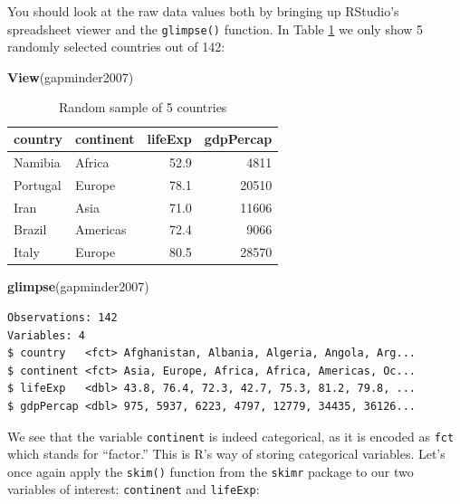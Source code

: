 \documentclass[12pt, krantz2,]{krantz}
\makeatletter
\newenvironment{Shaded}{\begin{snugshade}}{\end{snugshade}}
\newcommand{\KeywordTok}[1]{\textcolor[rgb]{0.27,0.27,0.27}{\textbf{#1}}}
\newcommand{\NormalTok}[1]{#1}
\newenvironment{kframe}{%
\medskip{}
\setlength{\fboxsep}{.8em}
 \def\at@end@of@kframe{}%
 \ifinner\ifhmode%
  \def\at@end@of@kframe{\end{minipage}}%
  \begin{minipage}{\columnwidth}%
 \fi\fi%
 \def\FrameCommand##1{\hskip\@totalleftmargin \hskip-\fboxsep
 \colorbox{shadecolor}{##1}\hskip-\fboxsep
     \hskip-\linewidth \hskip-\@totalleftmargin \hskip\columnwidth}%
 \MakeFramed {\advance\hsize-\width
   \@totalleftmargin\z@ \linewidth\hsize
   \@setminipage}}%
 {\par\unskip\endMakeFramed%
 \at@end@of@kframe}
\renewenvironment{Shaded}{\begin{kframe}}{\end{kframe}}
\makeatother
\begin{document}
You should look at the raw data values both by bringing up RStudio's spreadsheet viewer and the \texttt{glimpse()} function. In Table \ref{tab:model2-data-preview} we only show 5 randomly selected countries out of 142:

\begin{Shaded}
\begin{Highlighting}[]
\KeywordTok{View}\NormalTok{(gapminder2007)}
\end{Highlighting}
\end{Shaded}

\begin{table}[H]

\caption{\label{tab:model2-data-preview}Random sample of 5 countries}
\centering
\fontsize{10}{12}\selectfont
\begin{tabular}{llrr}
\toprule
country & continent & lifeExp & gdpPercap\\
\midrule
Namibia & Africa & 52.9 & 4811\\
Portugal & Europe & 78.1 & 20510\\
Iran & Asia & 71.0 & 11606\\
Brazil & Americas & 72.4 & 9066\\
Italy & Europe & 80.5 & 28570\\
\bottomrule
\end{tabular}
\end{table}

\begin{Shaded}
\begin{Highlighting}[]
\KeywordTok{glimpse}\NormalTok{(gapminder2007)}
\end{Highlighting}
\end{Shaded}

\begin{verbatim}
Observations: 142
Variables: 4
$ country   <fct> Afghanistan, Albania, Algeria, Angola, Arg...
$ continent <fct> Asia, Europe, Africa, Africa, Americas, Oc...
$ lifeExp   <dbl> 43.8, 76.4, 72.3, 42.7, 75.3, 81.2, 79.8, ...
$ gdpPercap <dbl> 975, 5937, 6223, 4797, 12779, 34435, 36126...
\end{verbatim}

We see that the variable \texttt{continent} is indeed categorical, as it is encoded as \texttt{fct} which stands for ``factor.'' This is R's way of storing categorical variables. Let's once again apply the \texttt{skim()} function from the \texttt{skimr} package to our two variables of interest: \texttt{continent} and \texttt{lifeExp}:
\end{document}
